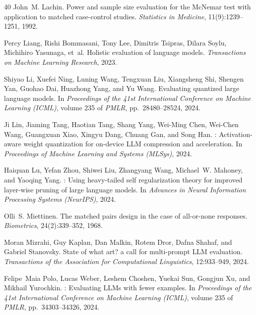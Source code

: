 \documentclass{article}
\begin{document}
\begin{thebibliography}{40}
John~M. Lachin.
\newblock Power and sample size evaluation for the {McNemar} test with application to matched case-control studies.
\newblock \emph{Statistics in Medicine}, 11(9):1239--1251, 1992.

Percy Liang, Rishi Bommasani, Tony Lee, Dimitris Tsipras, Dilara Soylu, Michihiro Yasunaga, et~al.
\newblock Holistic evaluation of language models.
\newblock \emph{Transactions on Machine Learning Research}, 2023.

Shiyao Li, Xuefei Ning, Luning Wang, Tengxuan Liu, Xiangsheng Shi, Shengen Yan, Guohao Dai, Huazhong Yang, and Yu Wang.
\newblock Evaluating quantized large language models.
\newblock In \emph{Proceedings of the 41st International Conference on Machine Learning (ICML)}, volume 235 of \emph{PMLR}, pp.\ 28480--28524, 2024.

Ji Lin, Jiaming Tang, Haotian Tang, Shang Yang, Wei-Ming Chen, Wei-Chen Wang, Guangxuan Xiao, Xingyu Dang, Chuang Gan, and Song Han.
: Activation-aware weight quantization for on-device {LLM} compression and acceleration.
\newblock In \emph{Proceedings of Machine Learning and Systems (MLSys)}, 2024.

Haiquan Lu, Yefan Zhou, Shiwei Liu, Zhangyang Wang, Michael~W. Mahoney, and Yaoqing Yang.
: Using heavy-tailed self regularization theory for improved layer-wise pruning of large language models.
\newblock In \emph{Advances in Neural Information Processing Systems (NeurIPS)}, 2024.

Olli~S. Miettinen.
\newblock The matched pairs design in the case of all-or-none responses.
\newblock \emph{Biometrics}, 24(2):339--352, 1968.

Moran Mizrahi, Guy Kaplan, Dan Malkin, Rotem Dror, Dafna Shahaf, and Gabriel Stanovsky.
\newblock State of what art? a call for multi-prompt {LLM} evaluation.
\newblock \emph{Transactions of the Association for Computational Linguistics}, 12:933--949, 2024.

Felipe~Maia Polo, Lucas Weber, Leshem Choshen, Yuekai Sun, Gongjun Xu, and Mikhail Yurochkin.
: Evaluating {LLM}s with fewer examples.
\newblock In \emph{Proceedings of the 41st International Conference on Machine Learning (ICML)}, volume 235 of \emph{PMLR}, pp.\ 34303--34326, 2024.


\end{thebibliography}
\end{document}
